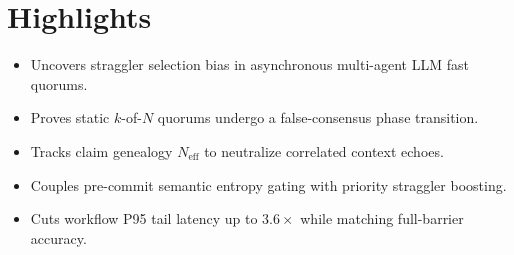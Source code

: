 \documentclass[11pt]{article}
\begin{document}
\section*{Highlights}
\begin{itemize}
  \item Uncovers straggler selection bias in asynchronous multi-agent LLM fast quorums.
  \item Proves static $k$-of-$N$ quorums undergo a false-consensus phase transition.
  \item Tracks claim genealogy $N_{\mathrm{eff}}$ to neutralize correlated context echoes.
  \item Couples pre-commit semantic entropy gating with priority straggler boosting.
  \item Cuts workflow P95 tail latency up to $3.6\times$ while matching full-barrier accuracy.
\end{itemize}
\end{document}
